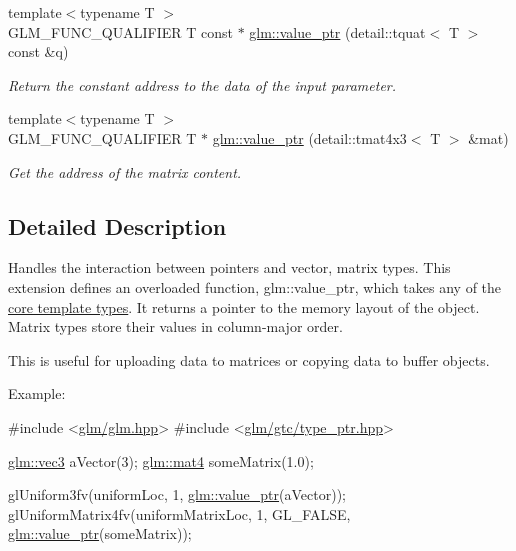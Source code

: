 \begin{DoxyCompactItemize}
{\footnotesize template$<$typename T $>$ }\\G\-L\-M\-\_\-\-F\-U\-N\-C\-\_\-\-Q\-U\-A\-L\-I\-F\-I\-E\-R T const $\ast$ \hyperlink{group__gtc__type__ptr_ga348519eaf9bb56244727eabb314f6892}{glm\-::value\-\_\-ptr} (detail\-::tquat$<$ T $>$ const \&q)
\begin{DoxyCompactList}\small\item\em Return the constant address to the data of the input parameter. \end{DoxyCompactList}\item 
{\footnotesize template$<$typename T $>$ }\\G\-L\-M\-\_\-\-F\-U\-N\-C\-\_\-\-Q\-U\-A\-L\-I\-F\-I\-E\-R T $\ast$ \hyperlink{group__gtc__type__ptr_gae821d2d76715dfe8eb4a9c7eac845dc4}{glm\-::value\-\_\-ptr} (detail\-::tmat4x3$<$ T $>$ \&mat)
\begin{DoxyCompactList}\small\item\em Get the address of the matrix content. \end{DoxyCompactList}\end{DoxyCompactItemize}


\subsection{Detailed Description}
Handles the interaction between pointers and vector, matrix types. This extension defines an overloaded function, glm\-::value\-\_\-ptr, which takes any of the \hyperlink{group__core__template}{core template types}. It returns a pointer to the memory layout of the object. Matrix types store their values in column-\/major order.

This is useful for uploading data to matrices or copying data to buffer objects.

Example\-: 
\begin{DoxyCode}
\textcolor{preprocessor}{#include <\hyperlink{glm_8hpp}{glm/glm.hpp}>}
\textcolor{preprocessor}{#include <\hyperlink{type__ptr_8hpp}{glm/gtc/type\_ptr.hpp}>}

\hyperlink{structglm_1_1detail_1_1tvec3}{glm::vec3} aVector(3);
\hyperlink{structglm_1_1detail_1_1tmat4x4}{glm::mat4} someMatrix(1.0);

glUniform3fv(uniformLoc, 1, \hyperlink{group__gtc__type__ptr_ga140f5c39d519780c61e02e47daa7d18a}{glm::value\_ptr}(aVector));
glUniformMatrix4fv(uniformMatrixLoc, 1, GL\_FALSE, \hyperlink{group__gtc__type__ptr_ga140f5c39d519780c61e02e47daa7d18a}{glm::value\_ptr}(someMatrix));
\end{DoxyCode}


